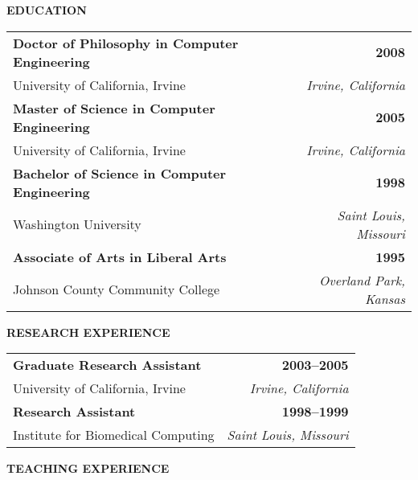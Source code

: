 \documentclass[12pt,fleqn]{ucithesis}
\begin{document}
\curriculumvitae
{

	\textbf{EDUCATION}

	\begin{tabular*}{1\textwidth}{@{\extracolsep{\fill}}lr}
		\textbf{Doctor of Philosophy in Computer Engineering} & \textbf{2008} \\
		\vspace{6pt}
		University of California, Irvine & \emph{Irvine, California} \\
		\textbf{Master of Science in Computer Engineering} & \textbf{2005} \\
		\vspace{6pt}
		University of California, Irvine & \emph{Irvine, California} \\
		\textbf{Bachelor of Science in Computer Engineering} & \textbf{1998} \\
		\vspace{6pt}
		Washington University & \emph{Saint Louis, Missouri} \\
		\textbf{Associate of Arts in Liberal Arts} & \textbf{1995} \\
		Johnson County Community College & \emph{Overland Park, Kansas} \\
	\end{tabular*}

	\vspace{12pt}
	\textbf{RESEARCH EXPERIENCE}

	\begin{tabular*}{1\textwidth}{@{\extracolsep{\fill}}lr}
		\textbf{Graduate Research Assistant} & \textbf{2003--2005} \\
		\vspace{6pt}
		University of California, Irvine & \emph{Irvine, California} \\
		\textbf{Research Assistant} & \textbf{1998--1999} \\
		Institute for Biomedical Computing & \emph{Saint Louis, Missouri} \\
	\end{tabular*}

	\vspace{12pt}
	\textbf{TEACHING EXPERIENCE}

}
\end{document}
